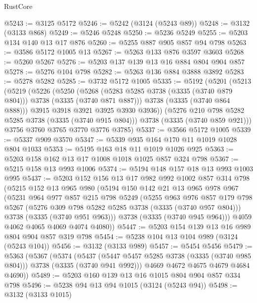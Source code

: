 \begin{lexlean}{RustCore}
\begin{coremodule}
@5243 := @3125 @5172
@5246 := @5242 (@3124 (@5243 @89))
@5248 := @3132 (@3133 @868)
@5249 := @5246 @5248
@5250 := @5236 @5249
@5255 := @5203 @134 @140 @13 @17 @876
@5260 := @5255 @887 @905 @857 @94 @798
@5263 := @3586 @5172 @1005 @13
@5267 := @5263 @133 @876 @3597 @3603
@5268 := @5260 @5267
@5276 := @5203 @137 @139 @13 @16 @884 @804 @904 @857
@5278 := @5276 @104 @798
@5282 := @5263 @136 @884 @3888 @3892
@5283 := @5278 @5282
@5285 := @3732 @5172 @1005
@5335 := @5192
    (@5201
      (@5213
        (@5219
          (@5226
            (@5250
              (@5268 (@5283 @5285 @3738 (@3335 (@3740 @879 @804))) @3738 (@3335 (@3740 @871 @887)))
              @3738
              (@3335 (@3740 @864 @888)))
            @3915
            @3918
            @3921
            @3925
            @3930
            @3936))
        (@5276 @210 @798 @5282 @5285 @3738 (@3335 (@3740 @915 @804)))
        @3738
        (@3335 (@3740 @859 @921)))
      @3756
      @3760
      @3765
      @3770
      @3776
      @3785)
@5337 := @3566 @5172 @1005
@5339 := @5337 @909 @3570
@5347 := @5339 @935 @164 @170 @11 @1019 @1028 @804 @1033
@5353 := @5195 @163 @18 @11 @1019 @1026 @925
@5363 := @5203 @158 @162 @13 @17 @1008 @1018 @1025 @857 @324 @798
@5367 := @5215 @158 @13 @993 @1006
@5374 := @5194 @148 @157 @18 @13 @993 @1003 @995
@5437 := @5203
    @152
    @156
    @13
    @17
    @982
    @992
    @1002
    @857
    @314
    @798
    (@5215
      @152
      @13
      @965
      @980
      (@5194
        @150
        @142
        @21
        @13
        @965
        @978
        @967
        (@5231
          @964
          @977
          @857
          @215
          @798
          @5249
          (@5255
            @963
            @976
            @857
            @179
            @798
            @5267
            (@5276 @309 @798 @5282 @5285 @3738 (@3335 (@3740 @957 @804)))
            @3738
            (@3335 (@3740 @951 @963)))
          @3738
          (@3335 (@3740 @945 @964)))
        @4059
        @4062
        @4065
        @4069
        @4074
        @4080))
@5447 := @5203 @154 @139 @13 @16 @989 @804 @904 @857 @319 @798
@5454 := @5238 @104 @13 @104 @989 (@3124 (@5243 @104))
@5456 := @3132 (@3133 @989)
@5457 := @5454 @5456
@5479 := @5363
    (@5367
      (@5374
        (@5437 (@5447 @5457 @5285 @3738 (@3335 (@3740 @985 @804))) @3738 (@3335 (@3740 @941 @992)))
        @4669
        @4672
        @4675
        @4679
        @4684
        @4690))
@5489 := @5203 @160 @139 @13 @16 @1015 @804 @904 @857 @334 @798
@5496 := @5238 @94 @13 @94 @1015 (@3124 (@5243 @94))
@5498 := @3132 (@3133 @1015)

\end{coremodule}
\end{lexlean}
